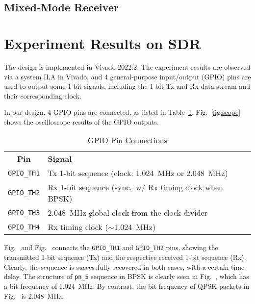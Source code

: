 \documentclass[journal,twoside]{IEEEtran}
\newcommand{\tabvertspace}{\specialrule{0em}{0.08em}{.08em}}
\begin{document}
    \subsection{Mixed-Mode Receiver}

  \section{Experiment Results on SDR}

    The design is implemented in Vivado 2022.2.
    The experiment results are observed via a system ILA in Vivado,
    and 4 general-purpose input/output (GPIO) pins are used to output some 1-bit signals,
    including the 1-bit Tx and Rx data stream and their corresponding clock.

    In our design, 4 GPIO pins are connected, as listed in Table~\ref{tab:gpio_pins}.
    Fig.~\ref{fig:scope} shows the oscilloscope results of the GPIO outputs.
    \begin{table}[htbp]
      \caption{GPIO Pin Connections}
      \label{tab:gpio_pins}
      \renewcommand{\arraystretch}{1.2}
      \begin{tabularx}{\linewidth}{cX}
        \toprule\tabvertspace
        \textbf{Pin} & \textbf{Signal} \\
        \tabvertspace\midrule
        \texttt{GPIO\_TH1} & Tx 1-bit sequence (clock: \qty{1.024}{MHz} or \qty{2.048}{MHz}) \\
        \texttt{GPIO\_TH2} & Rx 1-bit sequence (sync.\ w/ Rx timing clock when BPSK) \\
        \texttt{GPIO\_TH3} & \qty{2.048}{MHz} global clock from the clock divider \\
        \texttt{GPIO\_TH4} & Rx timing clock ($\sim$\qty{1.024}{MHz}) \\
        \bottomrule
      \end{tabularx}
    \end{table}

    Fig.~ and Fig.~
    connects the \texttt{GPIO\_TH1} and \texttt{GPIO\_TH2} pins,
    showing the transmitted 1-bit sequence (Tx) and the respective received 1-bit sequence (Rx).
    Clearly, the sequence is successfully recovered in both cases, with a certain time delay.
    The structure of \texttt{pn\_5} sequence in BPSK is clearly seen in Fig.~,
    which has a bit frequency of \qty{1.024}{MHz}.
    By contrast, the bit frequency of QPSK packets in Fig.~ is \qty{2.048}{MHz}.
\end{document}
